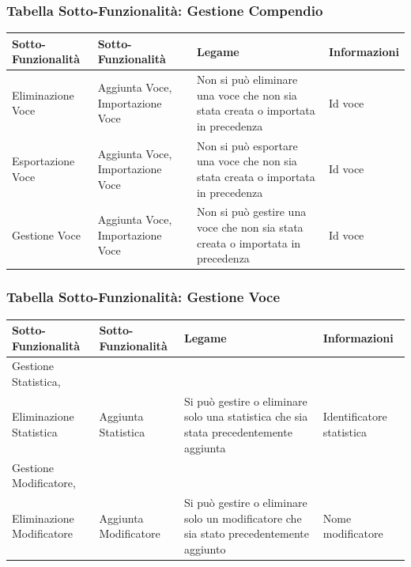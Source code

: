 \documentclass[a4paper, 11pt]{article}
\let\newline\\
\begin{document}
\subsubsection*{Tabella Sotto-Funzionalità: Gestione Compendio}
\begin{adjustwidth}{-1cm}{-1cm}
\begin{center}
    \begin{tabular}{|p{4cm}|p{4cm}|p{4cm}|p{2.5cm}|}
        \hline
        \textbf{Sotto-Funzionalità} & \textbf{Sotto-Funzionalità} & \textbf{Legame} & \textbf{Informazioni} \\\hline
        Eliminazione Voce & Aggiunta Voce, Importazione Voce & Non si può eliminare una voce che non sia stata creata o importata in precedenza & Id voce \\\hline
        Esportazione Voce & Aggiunta Voce, Importazione Voce & Non si può esportare una voce che non sia stata creata o importata in precedenza & Id voce \\\hline
        Gestione Voce & Aggiunta Voce, Importazione Voce & Non si può gestire una voce che non sia stata creata o importata in precedenza & Id voce \\\hline
    \end{tabular}
\end{center}
\end{adjustwidth}

\vspace{2em}

\subsubsection*{Tabella Sotto-Funzionalità: Gestione Voce}
\begin{adjustwidth}{-1cm}{-1cm}
\begin{center}
    \begin{tabular}{|p{4cm}|p{4cm}|p{4cm}|p{2.5cm}|}
        \hline
        \textbf{Sotto-Funzionalità} & \textbf{Sotto-Funzionalità} & \textbf{Legame} & \textbf{Informazioni} \\\hline
        Gestione Statistica, \newline Eliminazione Statistica & Aggiunta Statistica & Si può gestire o eliminare solo una statistica che sia stata precedentemente aggiunta & Identificatore statistica \\\hline
        Gestione Modificatore, \newline Eliminazione Modificatore & Aggiunta Modificatore & Si può gestire o eliminare solo un modificatore che sia stato precedentemente aggiunto & Nome modificatore \\\hline
    \end{tabular}
\end{center}
\end{adjustwidth}
\end{document}

